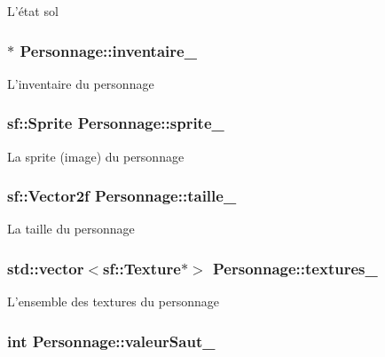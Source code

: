L'état sol \hypertarget{classPersonnage_ae340ea617523029180a0556789f5e38d}{
\subsubsection[{inventaire\-\_\-}]{$\ast$ Personnage\-::inventaire\-\_\-\hspace{0.3cm}{\ttfamily [protected]}}}\label{classPersonnage_ae340ea617523029180a0556789f5e38d}
L'inventaire du personnage \hypertarget{classPersonnage_a2ead6ffe2f28cad6f35f22a411d057d6}{
\subsubsection[{sprite\-\_\-}]{\setlength{\rightskip}{0pt plus 5cm}sf\-::\-Sprite Personnage\-::sprite\-\_\-\hspace{0.3cm}{\ttfamily [protected]}}}\label{classPersonnage_a2ead6ffe2f28cad6f35f22a411d057d6}
La sprite (image) du personnage \hypertarget{classPersonnage_ad9e9c1c2a9d317e9502f3ba5f8e5e7d9}{
\subsubsection[{taille\-\_\-}]{\setlength{\rightskip}{0pt plus 5cm}sf\-::\-Vector2f Personnage\-::taille\-\_\-\hspace{0.3cm}{\ttfamily [protected]}}}\label{classPersonnage_ad9e9c1c2a9d317e9502f3ba5f8e5e7d9}
La taille du personnage \hypertarget{classPersonnage_a3a1d39c8f1d80a800cafc7fc34e5b578}{
\subsubsection[{textures\-\_\-}]{\setlength{\rightskip}{0pt plus 5cm}std\-::vector$<$sf\-::\-Texture$\ast$$>$ Personnage\-::textures\-\_\-\hspace{0.3cm}{\ttfamily [protected]}}}\label{classPersonnage_a3a1d39c8f1d80a800cafc7fc34e5b578}
L'ensemble des textures du personnage \hypertarget{classPersonnage_a5a90b56d0e845fc46f670eb1451facbc}{
\subsubsection[{valeur\-Saut\-\_\-}]{\setlength{\rightskip}{0pt plus 5cm}int Personnage\-::valeur\-Saut\-\_\-\hspace{0.3cm}{\ttfamily [protected]}}}\label{classPersonnage_a5a90b56d0e845fc46f670eb1451facbc}
